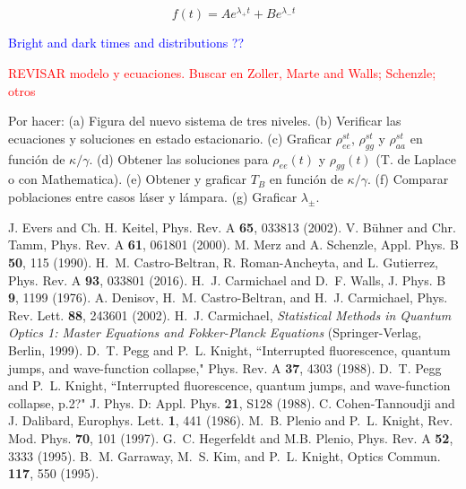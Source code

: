 \documentclass[twocolumn,aps,eqsecnum,showkeys,amsmath]{revtex4-2}
\begin{document}
$$ f(t) = A e^{\lambda_+ t} +B e^{\lambda_- t}$$ 

\textcolor{blue}{Bright and dark times and distributions ??}

\textcolor{red}{REVISAR modelo y ecuaciones. Buscar en Zoller, Marte 
and Walls; Schenzle; otros}


Por hacer: (a) Figura del nuevo sistema de tres niveles. (b) Verificar 
las ecuaciones y soluciones en estado estacionario. (c) Graficar 
$\rho_{ee}^{st}$, $\rho_{gg}^{st}$  y $\rho_{aa}^{st}$ en funci\'on de 
$\kappa/\gamma$. (d) Obtener las soluciones para $\rho_{ee}(t)$ y 
$\rho_{gg}(t)$ (T. de Laplace o con Mathematica). (e) Obtener 
y graficar $T_B$ en funci\'on de $\kappa/\gamma$. (f) Comparar 
poblaciones entre casos l\'aser y l\'ampara. (g) Graficar $\lambda_{\pm}$. 

\begin{references} %
%
 J. Evers and Ch. H. Keitel, Phys. Rev. A 
\textbf{65}, 033813 (2002). 
%
 V. B\"uhner and Chr. Tamm, Phys. Rev. A 
\textbf{61}, 061801 (2000). 
%
 M. Merz and A. Schenzle, Appl. Phys. B 
\textbf{50}, 115 (1990). 
%
 H.~M. Castro-Beltran, R. Roman-Ancheyta, and 
L. Gutierrez, Phys. Rev. A \textbf{93}, 033801 (2016). 
%
 H.~J. Carmichael and D.~F. Walls, J. Phys. B 
	{\bf 9}, 1199 (1976).
%
 A. Denisov, H.~M. Castro-Beltran, and H.~J. Carmichael, 
	Phys. Rev. Lett. {\bf 88}, 243601 (2002).
%
%
 H.~J. Carmichael, \textit{Statistical Methods in 
Quantum Optics 1: Master Equations and Fokker-Planck Equations} 
(Springer-Verlag, Berlin, 1999).
%
 D.~T. Pegg and P.~L. Knight, ``Interrupted 
fluorescence, quantum jumps, and wave-function collapse," 
Phys. Rev. A \textbf{37}, 4303 (1988). 
%
 D.~T. Pegg and P.~L. Knight, ``Interrupted 
fluorescence, quantum jumps, and wave-function collapse, p.2?" 
J. Phys. D: Appl. Phys. \textbf{21}, S128 (1988). 
%
 C. Cohen-Tannoudji and J. Dalibard, Europhys. Lett. 
\textbf{1}, 441 (1986). 
%
 M.~B. Plenio and P.~L. Knight, Rev. Mod. Phys. 
{\bf 70}, 101 (1997). 
%
 G.~C. Hegerfeldt and M.B. Plenio, Phys. Rev. A 
\textbf{52}, 3333 (1995). 
%
 B.~M. Garraway, M.~S. Kim, and P.~L. Knight, 
	Optics Commun. \textbf{117}, 550 (1995).
%


\end{references} %
\end{document}
